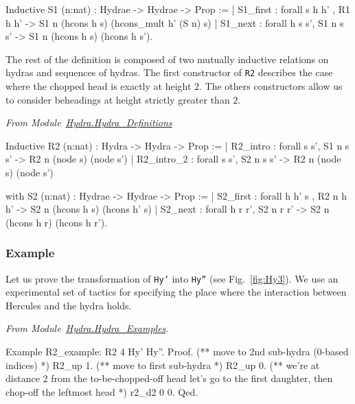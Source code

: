\begin{Coqsrc}
Inductive S1 (n:nat)  : Hydrae -> Hydrae -> Prop :=
| S1_first : forall s h h' ,   R1 h h' -> 
                  S1 n (hcons h s) (hcons_mult h' (S n) s)
| S1_next : forall h s s',  S1 n s s' ->
                   S1 n (hcons h s) (hcons h s').
\end{Coqsrc}


The rest of the definition is composed of two mutually inductive relations on hydras and sequences of hydras. The first constructor of \texttt{R2} describes the case where the chopped head is exactly at height $2$. The others constructors allow us to consider beheadings at height strictly greater than $2$.


\vspace{4pt}
\emph{From Module~\href{../theories/html/hydras.Hydra.Hydra_Definitions.html\#R2}{Hydra.Hydra\_Definitions}}

\begin{Coqsrc}
Inductive R2 (n:nat)  :  Hydra -> Hydra -> Prop :=
| R2_intro : forall s s', S1 n s s' -> R2 n (node s) (node s')
| R2_intro_2 : forall s s', S2 n s s' -> R2 n (node s) (node s')

with S2 (n:nat) :  Hydrae -> Hydrae -> Prop :=
|  S2_first : forall h h' s ,
               R2 n  h h'  -> 
               S2  n (hcons h s) (hcons h'  s)
|  S2_next  : forall h   r r',
               S2 n   r r' ->
               S2 n (hcons h r) (hcons h r').                  
\end{Coqsrc}


\subsubsection{Example}
Let us prove the transformation of \texttt{Hy'} into \texttt{Hy''} (see Fig.~\vref{fig:Hy3}). We use an experimental set of tactics for specifying the place where the 
interaction between Hercules and the hydra holds. 


\vspace{4pt}\emph{From Module~\href{../theories/html/hydras.Hydra.Hydra_Examples.html}{Hydra.Hydra\_Examples}}. 

\begin{Coqsrc}
Example R2_example:  R2 4 Hy' Hy''.
Proof.
    (** move to 2nd sub-hydra (0-based indices) *) R2_up 1. 
    (** move to first sub-hydra *)  R2_up 0.
    (** we're at distance 2 from the to-be-chopped-off head 
        let's go to the first daughter, 
        then chop-off the leftmost head *)  r2_d2  0 0. 
Qed.
\end{Coqsrc}

